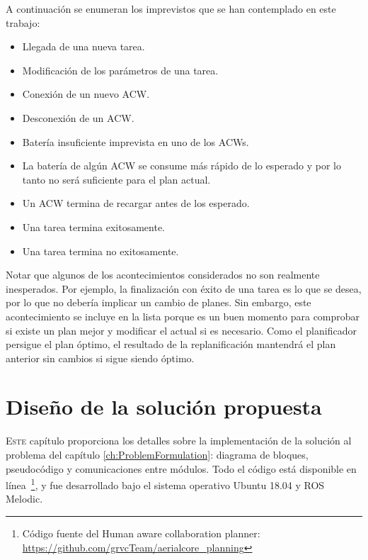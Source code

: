 \documentclass[fontsize=11pt, English=false, Español=true, Myfinal=true, twoside, numbers=noenddot]{scrbook}
\begin{document}
A continuación se enumeran los imprevistos que se han contemplado en este trabajo:

\begin{itemize}
    \item Llegada de una nueva tarea.
    \item Modificación de los parámetros de una tarea.
    \item Conexión de un nuevo \gls{ACW}.
    \item Desconexión de un \gls{ACW}.
    \item Batería insuficiente imprevista en uno de los \glspl{ACW}.
    \item La batería de algún \gls{ACW} se consume más rápido de lo esperado y por lo tanto no será suficiente para el plan actual.
    \item Un \gls{ACW} termina de recargar antes de los esperado.
    \item Una tarea termina exitosamente.
    \item Una tarea termina no exitosamente.
\end{itemize}

Notar que algunos de los acontecimientos considerados no son realmente inesperados. Por ejemplo, la finalización con éxito de una tarea es lo que se desea, por lo que no debería implicar un cambio de planes. Sin embargo, este acontecimiento se incluye en la lista porque es un buen momento para comprobar si existe un plan mejor y modificar el actual si es necesario. Como el planificador persigue el plan óptimo, el resultado de la replanificación mantendrá el plan anterior sin cambios si sigue siendo óptimo.
%
%
\chapter{Diseño de la solución propuesta}
\label{ch:DesignOfTheProposedSolution}
\lettrine[lraise=-0.1, lines=2, loversize=0.2]{E}{ste} capítulo proporciona los detalles sobre la implementación de la solución al problema del capítulo \ref{ch:ProblemFormulation}: diagrama de bloques, pseudocódigo y comunicaciones entre módulos. Todo el código está disponible en línea~\footnote{Código fuente del Human aware collaboration planner: \url{https://github.com/grvcTeam/aerialcore_planning}}, y fue desarrollado bajo el sistema operativo Ubuntu 18.04 y ROS Melodic.
\end{document}
